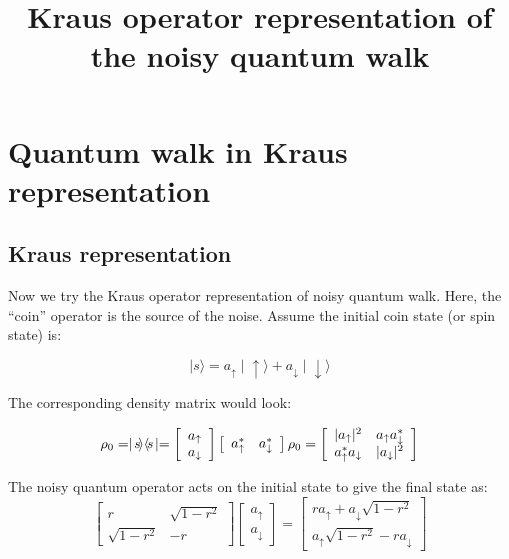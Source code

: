\documentclass[english]{article}
\DeclarePairedDelimiter\abs{\lvert}{\rvert}
\begin{document}
\title{Kraus operator representation of the noisy quantum walk}
\maketitle

\section{Quantum walk in Kraus representation}

\subsection{Kraus representation}

Now we try the Kraus operator representation of noisy quantum walk. Here, the ``coin'' operator is the source of the noise. Assume the initial coin state (or spin state) is:

$$ \mid\!s\!\rangle = a_{\uparrow} \mid\!\uparrow\!\rangle + a_{\downarrow} \mid\!\downarrow\!\rangle $$

The corresponding density matrix would look:

\begin{eqnarray}
  \rho_{0} = \mid\!s\!\rangle \langle\!s\!\mid = \left[\begin{array}{c} a_{\uparrow}\\ a_{\downarrow}\end{array}\right] \left[\begin{array}{c}a_{\uparrow}^{*}\quad a_{\downarrow}^{*}\end{array} \right]
\rho_{0}  = \left[\begin{array}{cc}\abs{a_{\uparrow}}^{2} & a_{\uparrow}a_{\downarrow}^{*} \\
               a_{\uparrow}^{*}a_{\downarrow} & \abs{a_{\downarrow}}^{2}
    \end{array} \right]
\end{eqnarray}


The noisy quantum operator acts on the initial state to give the final state as:
$$
\left[\begin{array}{cc} r & \sqrt{1 - r^{2}} \\\sqrt{1 - r^{2}} & -r \end{array}\right] \left[\begin{array}{c} a_{\uparrow} \\ a_{\downarrow} \end{array}\right] = \left[\begin{array}{c}ra_{\uparrow} + a_{\downarrow}\sqrt{1 - r^{2}} \\ a_{\uparrow}\sqrt{1 - r^{2}} - ra_{\downarrow} \end{array}\right]
$$
\end{document}
